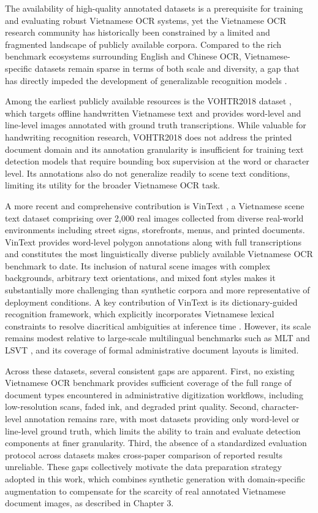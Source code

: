 The availability of high-quality annotated datasets is a prerequisite for training and evaluating robust Vietnamese OCR systems, yet the Vietnamese OCR research community has historically been constrained by a limited and fragmented landscape of publicly available corpora. Compared to the rich benchmark ecosystems surrounding English and Chinese OCR, Vietnamese-specific datasets remain sparse in terms of both scale and diversity, a gap that has directly impeded the development of generalizable recognition models \cite{Nguyen2021}.

Among the earliest publicly available resources is the VOHTR2018 dataset \cite{Nguyen2018}, which targets offline handwritten Vietnamese text and provides word-level and line-level images annotated with ground truth transcriptions. While valuable for handwriting recognition research, VOHTR2018 does not address the printed document domain and its annotation granularity is insufficient for training text detection models that require bounding box supervision at the word or character level. Its annotations also do not generalize readily to scene text conditions, limiting its utility for the broader Vietnamese OCR task.

A more recent and comprehensive contribution is VinText \cite{Nguyen2021}, a Vietnamese scene text dataset comprising over 2,000 real images collected from diverse real-world environments including street signs, storefronts, menus, and printed documents. VinText provides word-level polygon annotations along with full transcriptions and constitutes the most linguistically diverse publicly available Vietnamese OCR benchmark to date. Its inclusion of natural scene images with complex backgrounds, arbitrary text orientations, and mixed font styles makes it substantially more challenging than synthetic corpora and more representative of deployment conditions. A key contribution of VinText is its dictionary-guided recognition framework, which explicitly incorporates Vietnamese lexical constraints to resolve diacritical ambiguities at inference time \cite{Nguyen2021}. However, its scale remains modest relative to large-scale multilingual benchmarks such as MLT \cite{Nayef2017} and LSVT \cite{Sun2019}, and its coverage of formal administrative document layouts is limited.

Across these datasets, several consistent gaps are apparent. First, no existing Vietnamese OCR benchmark provides sufficient coverage of the full range of document types encountered in administrative digitization workflows, including low-resolution scans, faded ink, and degraded print quality. Second, character-level annotation remains rare, with most datasets providing only word-level or line-level ground truth, which limits the ability to train and evaluate detection components at finer granularity. Third, the absence of a standardized evaluation protocol across datasets makes cross-paper comparison of reported results unreliable. These gaps collectively motivate the data preparation strategy adopted in this work, which combines synthetic generation with domain-specific augmentation to compensate for the scarcity of real annotated Vietnamese document images, as described in Chapter 3.
